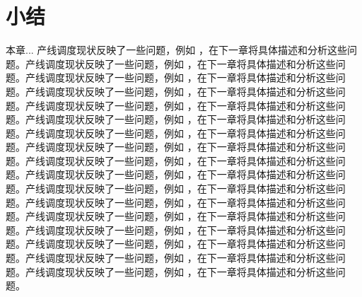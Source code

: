 \begin{figure}[h]
\begin{floatrow}[2]
\end{floatrow}
\end{figure}
\section{小结}
本章...
产线调度现状反映了一些问题，例如 ，在下一章将具体描述和分析这些问题。产线调度现状反映了一些问题，例如 ，在下一章将具体描述和分析这些问题。产线调度现状反映了一些问题，例如 ，在下一章将具体描述和分析这些问题。产线调度现状反映了一些问题，例如 ，在下一章将具体描述和分析这些问题。产线调度现状反映了一些问题，例如 ，在下一章将具体描述和分析这些问题。产线调度现状反映了一些问题，例如 ，在下一章将具体描述和分析这些问题。产线调度现状反映了一些问题，例如 ，在下一章将具体描述和分析这些问题。产线调度现状反映了一些问题，例如 ，在下一章将具体描述和分析这些问题。产线调度现状反映了一些问题，例如 ，在下一章将具体描述和分析这些问题。产线调度现状反映了一些问题，例如 ，在下一章将具体描述和分析这些问题。产线调度现状反映了一些问题，例如 ，在下一章将具体描述和分析这些问题。产线调度现状反映了一些问题，例如 ，在下一章将具体描述和分析这些问题。产线调度现状反映了一些问题，例如 ，在下一章将具体描述和分析这些问题。产线调度现状反映了一些问题，例如 ，在下一章将具体描述和分析这些问题。产线调度现状反映了一些问题，例如 ，在下一章将具体描述和分析这些问题。产线调度现状反映了一些问题，例如 ，在下一章将具体描述和分析这些问题。产线调度现状反映了一些问题，例如 ，在下一章将具体描述和分析这些问题。